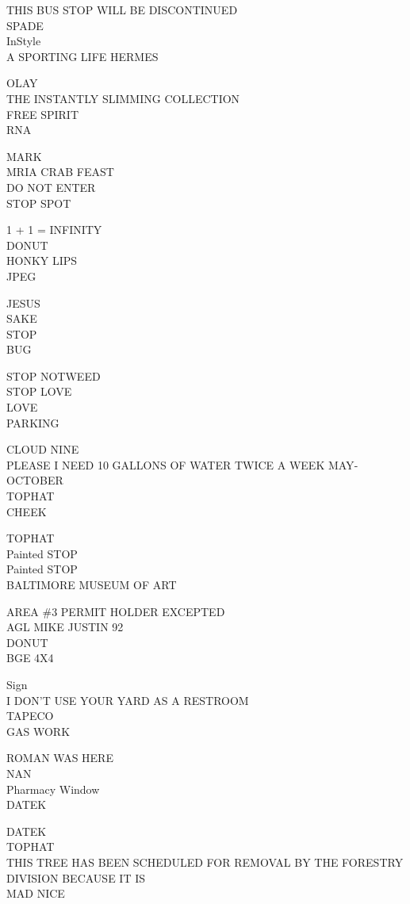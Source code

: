 \documentclass[10pt,letterpaper]{article}
\begin{document}
THIS BUS STOP WILL BE DISCONTINUED\\
SPADE\\
InStyle\\
A SPORTING LIFE HERMES

OLAY\\
THE INSTANTLY SLIMMING COLLECTION\\
FREE SPIRIT\\
RNA

MARK\\
MRIA CRAB FEAST\\
DO NOT ENTER\\
STOP SPOT

1 + 1 = INFINITY\\
DONUT\\
HONKY LIPS\\
JPEG

JESUS\\
SAKE\\
STOP\\
BUG

STOP NOTWEED\\
STOP LOVE\\
LOVE\\
PARKING

CLOUD NINE\\
PLEASE I NEED 10 GALLONS OF WATER TWICE A WEEK MAY{-}OCTOBER\\
TOPHAT\\
CHEEK

TOPHAT\\
Painted STOP\\
Painted STOP\\
BALTIMORE MUSEUM OF ART

AREA \#3 PERMIT HOLDER EXCEPTED\\
AGL MIKE JUSTIN 92\\
DONUT\\
BGE 4X4

Sign\\
I DON'T USE YOUR YARD AS A RESTROOM\\
TAPECO\\
GAS WORK

ROMAN WAS HERE\\
NAN\\
Pharmacy Window\\
DATEK

DATEK\\
TOPHAT\\
THIS TREE HAS BEEN SCHEDULED FOR REMOVAL BY THE FORESTRY DIVISION BECAUSE IT IS\\
MAD NICE
\end{document}
